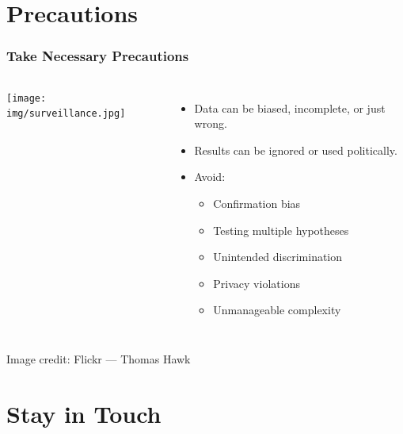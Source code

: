 \documentclass[11pt,
               aspectratio=169
               ]{beamer}
\begin{document}
	\section{Precautions}
		
		\begin{frame}
		
			\frametitle{Take Necessary Precautions}	
		
				\begin{columns}
					
						\centering
						\texttt{[image: img/surveillance.jpg]}
					
					\begin{itemize}
						\item Data can be biased, incomplete, or just wrong.
						\item Results can be ignored or used politically.
						\item Avoid:
							\begin{itemize} 
								\item Confirmation bias 
								\item Testing multiple hypotheses   
								\item Unintended discrimination 
								\item Privacy violations
								\item Unmanageable complexity
							\end{itemize}
					\end{itemize}				
						
				\end{columns} 

				\vspace{10pt}

				\tiny Image credit: Flickr --- Thomas Hawk

		\end{frame}

	\section*{Stay in Touch}
	
\end{document}
